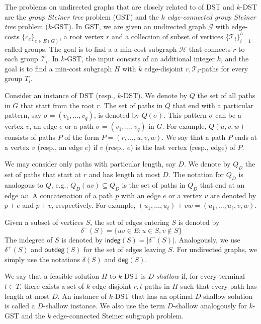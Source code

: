 \documentclass[11pt]{article}
\theoremstyle{definition}
\theoremstyle{remark}
\newcommand{\calG}{\mathcal{G}}
\newcommand{\calT}{\mathcal{T}}
\newcommand{\calH}{\mathcal{H}}
\renewcommand{\deg}{\mathsf{deg}}
\newcommand{\indeg}{\mathsf{indeg}}
\newcommand{\outdeg}{\mathsf{outdeg}}
\begin{document}
The problems on undirected graphs that are closely related to 
of DST and $k$-DST are the 
{\em group Steiner tree} problem (GST) and 
the {\em $k$ edge-connected group Steiner tree} problem ($k$-GST).
In GST, we are given an undirected graph $\calG$ with edge-costs
$\{c_e\}_{e\in E(G)}$, a root vertex $r$ and a collection of subset of
vertices $\{\calT_i\}_{i=1}^h$ called groups. The goal is to find a
a min-cost subgraph $\calH$ that connects $r$ to each group
$\calT_i$. In $k$-GST, the input consists of an additional integer $k$,
and the goal is to find a min-cost subgraph $H$ with $k$ edge-disjoint
$r,\calT_i$-paths for every group $T_i$.

Consider an instance of DST (resp., $k$-DST).
We denote by $Q$ the set of all paths in $G$ that start from the root $r$.
The set of paths in $Q$ that end with a particular pattern, say
$\sigma=(v_1,\ldots,v_q)$, is denoted by $Q(\sigma)$. This pattern $\sigma$
can be a vertex $v$, an edge $e$ or a path $\sigma=(v_1,\ldots,v_q)$ in
$G$. For example, $Q(u,v,w)$ consists of paths $P$ of the form
$P=(r,\ldots,u,v,w)$. We say that a path $P$ ends at a vertex $v$
(resp., an edge $e$) if $v$ (resp., $e$) is 
the last vertex (resp., edge) of $P$.

We may consider only paths with particular length, say $D$.
We denote by $Q_D$ the set of paths that start at $r$ and has length
at most $D$. The notation for $Q_D$ is analogous to $Q$, e.g.,
$Q_D(uv)\subseteq Q_D$ is the set of paths in $Q_D$ that end at an
edge $uv$.
A concatenation of a path $p$ with an edge $e$ or a vertex $v$
are denoted by $p+e$ and $p+v$, respectively.
For example, $(u_1,\ldots,u_{\ell})+vw=(u_1,\ldots,u_{\ell},v,w)$.

Given a subset of vertices $S$, 
the set of edges entering $S$ is denoted by 
\[
\delta^-(S) = \{uv \in E: u\in S, v\not\in S\}
\]
The indegree of $S$ is denoted by $\indeg(S) = |\delta^-(S)|$.
Analogously, we use $\delta^+(S)$ and $\outdeg(S)$ for
the set of edges leaving $S$.
For undirected graphs, we simply use the notations $\delta(S)$ and $\deg(S)$.

We say that a feasible solution $H$ to $k$-DST is {\em $D$-shallow}
if, for every terminal $t\in T$, there exists a set of 
$k$ edge-disjoint $r,t$-paths in $H$ such that every path has length at most
$D$.
An instance of $k$-DST that has an optimal $D$-shallow solution
is called a $D$-shallow instance.
We also use the term $D$-shallow analogously for $k$-GST
and the $k$ edge-connected Steiner subgraph problem.
\end{document}
